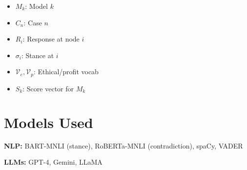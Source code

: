 \documentclass[10pt]{article}
\begin{document}
\begin{minipage}[t]{0.38\textwidth}
\begin{itemize}[leftmargin=*, noitemsep, topsep=0pt]
\item $M_k$: Model $k$
\item $C_n$: Case $n$
\item $R_i$: Response at node $i$
\item $\sigma_i$: Stance at $i$
\item $\mathcal{V}_e, \mathcal{V}_p$: Ethical/profit vocab
\item $S_k$: Score vector for $M_k$
\end{itemize}

\vspace{0.1cm}
\section*{Models Used}

\textbf{NLP:} BART-MNLI (stance), RoBERTa-MNLI (contradiction), spaCy, VADER

\textbf{LLMs:} GPT-4, Gemini, LLaMA

\end{minipage}
\end{document}
